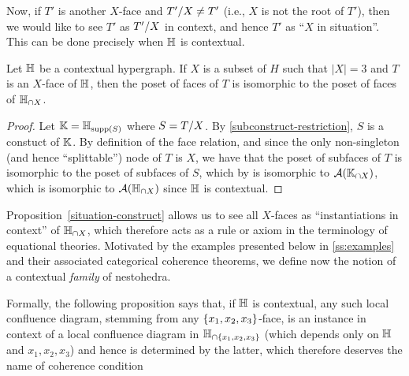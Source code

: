 Now, if $T'$ is another $X$-face and $T'/X\neq T'$ (i.e., $X$ is not the root of $T'$), then we would like to see  $T'$ as $T'/X$ in context, and hence $T'$ as ``$X$ in situation''.  
This can be done precisely when ${\mathbb H}$ is contextual.



\begin{proposition} \label{situation-construct}
Let ${\mathbb H}$ be a contextual hypergraph.
If $X$ is a subset of $H$ such that $|X|=3$ and $T$ is an $X$-face of ${\mathbb H}$, then the poset of faces of $T$ is isomorphic to the poset of faces of ${\mathbb H}_{\cap X}$.
\end{proposition}

\begin{proof} 
  Let ${\mathbb K}={\mathbb H}_{\operatorname{supp}(S)}$ where $S=T/X$. 
  By \cref{subconstruct-restriction}, $S$ is a constuct of ${\mathbb K}$. By definition of the face relation, and since the only non-singleton (and hence ``splittable'') node of $T$ is $X$, we have that the poset of subfaces of $T$ is isomorphic to the poset of subfaces of $S$, which by  is isomorphic to ${\cal A}({\mathbb K}_{\cap X})$, which is isomorphic to ${\cal A}({\mathbb H}_{\cap X})$ since ${\mathbb H}$ is contextual.
\end{proof}

Proposition~\ref{situation-construct} allows us to see all $X$-faces as ``instantiations in context'' of ${\mathbb H}_{\cap X}$, which therefore acts  as a rule or axiom in the terminology of equational theories.
Motivated by the examples presented below in \cref{ss:examples} and their associated categorical coherence theorems, we define now the notion of a contextual \emph{family} of nestohedra.

Formally, the following proposition says that, if ${\mathbb H}$ is contextual, any such local confluence diagram, stemming from any $\left\{x_1,x_2,x_3\right\}$-face, is an instance in context of a local confluence diagram in ${\mathbb H}_{\cap \left\{x_1,x_2,x_3\right\}}$ (which depends only on ${\mathbb H}$ and ${x_1,x_2,x_3}$) and hence is determined by the latter, which therefore deserves the name of coherence condition

